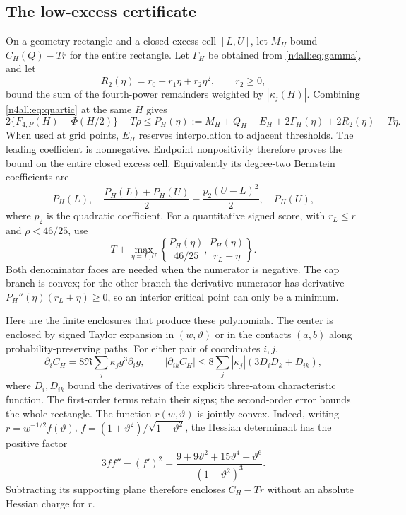 \documentclass[11pt,a4paper]{article}
\numberwithin{equation}{section}
\theoremstyle{definition}
\theoremstyle{remark}
\begin{document}
\subsection{The low-excess certificate}
On a geometry rectangle and a closed excess cell $[L,U]$, let
$M_H$ bound $C_H(Q)-Tr$ for the entire rectangle. Let
$\Gamma_H$ be obtained from \eqref{n4all:eq:gamma}, and let
\[
 R_2(\eta)=r_0+r_1\eta+r_2\eta^2,\qquad r_2\ge0,
\]
bound the sum of the fourth-power remainders weighted by
$|\kappa_j(H)|$. Combining \eqref{n4all:eq:quartic} at the same
$H$ gives
\begin{equation}\label{n4all:eq:low-polynomial}
 2\{F_{4,P}(H)-\Phi(H/2)\}-T\rho
 \le P_H(\eta):=M_H+Q_H+E_H+2\Gamma_H(\eta)+2R_2(\eta)-T\eta.
\end{equation}
When used at grid points, $E_H$ reserves interpolation to adjacent
thresholds. The leading coefficient is nonnegative. Endpoint
nonpositivity therefore proves the bound on the entire closed excess
cell. Equivalently its degree-two Bernstein coefficients are
\[
 P_H(L),\quad
 \frac{P_H(L)+P_H(U)}2-\frac{p_2(U-L)^2}{2},\quad P_H(U),
\]
where $p_2$ is the quadratic coefficient. For a quantitative signed
score, with $r_L\le r$ and $\rho<46/25$, use
\[
 T+\max_{\eta=L,U}
 \left\{\frac{P_H(\eta)}{46/25},
        \frac{P_H(\eta)}{r_L+\eta}\right\}.
\]
Both denominator faces are needed when the numerator is negative.
The cap branch is convex; for the other branch the derivative
numerator has derivative $P_H''(\eta)(r_L+\eta)\ge0$, so an
interior critical point can only be a minimum.

Here are the finite enclosures that produce these polynomials.
The center is enclosed by signed Taylor expansion in $(w,\vartheta)$
or in the contacts $(a,b)$ along probability-preserving paths.
For either pair of coordinates $i,j$,
\[
 \partial_i C_H=8\Re\sum_j\kappa_jg^3\partial_i g,\qquad
 |\partial_{ik}C_H|\le8\sum_j|\kappa_j|
       (3D_iD_k+D_{ik}),
\]
where $D_i,D_{ik}$ bound the derivatives of the explicit
three-atom characteristic function. The first-order terms retain
their signs; the second-order error bounds the whole rectangle.
The function $r(w,\vartheta)$ is jointly convex. Indeed, writing
$r=w^{-1/2}f(\vartheta)$, $f=(1+\vartheta^2)/\sqrt{1-\vartheta^2}$,
the Hessian determinant has the positive factor
\[
 3ff''-(f')^2=
 \frac{9+9\vartheta^2+15\vartheta^4-\vartheta^6}{(1-\vartheta^2)^3}.
\]
Subtracting its supporting plane therefore encloses $C_H-Tr$
without an absolute Hessian charge for $r$.
\end{document}
